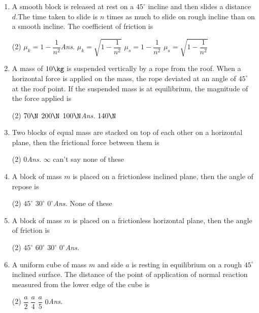 \documentclass{article}
\newcommand{\ans}{\textcolor{red!95}{\textit{\quad Ans.}}}
\begin{document}
\begin{enumerate}
\item A smooth block is released at rest on a $45^\circ$ incline and then slides a distance $d$.The time taken to slide is $n$ times as much to slide on rough incline than on a smooth incline. The coefficient of friction is
\begin{tasks}(2)
	\task $\mu_k=1-\dfrac{1}{n^2}$\ans
	\task $\mu_k=\sqrt{1-\dfrac{1}{n^2}}$
	\task $\mu_s=1-\dfrac{1}{n^2}$
	\task $\mu_s=\sqrt{1-\dfrac{1}{n^2}}$
\end{tasks}

\item A mass of $10 \kg$ is suspended vertically by a rope from the roof. When a horizontal force is applied on the mass, the rope deviated at an angle of $45^\circ$ at the roof point. If the suspended mass is at equilibrium, the magnitude of the force applied is
\begin{tasks}(2)
	\task $70\N$
	\task $200\N$
	\task $100\N$\ans
	\task $140\N$
\end{tasks}


\item Two blocks of equal mass are stacked on top of each other on a horizontal plane, then the frictional force between them is
\begin{tasks}(2)
	\task $0$\ans
	\task $\infty$
	\task can't say
	\task none of these
\end{tasks}

\item A block of mass $m$ is placed on a frictionless inclined plane, then the angle of repose is 
\begin{tasks}(2)
	\task $45^\circ$
	\task $30^\circ$
	\task $0^\circ$\ans
	\task None of these
\end{tasks}

\item A block of mass $m$ is placed on a frictionless horizontal plane, then the angle of friction is 
\begin{tasks}(2)
	\task $45^\circ$
	\task $60^\circ$
	\task $30^\circ$
	\task $0^\circ$\ans
\end{tasks}

\item A uniform cube of mass $m$ and side $a$ is resting in equilibrium on a rough $45^\circ$ inclined surface. The distance of the point of application of normal reaction measured from the lower edge of the cube is 
\begin{tasks}(2)
	\task $\dfrac{a}{2}$
	\task $\dfrac{a}{4}$
	\task $\dfrac{a}{5}$
	\task $0$\ans
\end{tasks}



\end{enumerate}
\end{document}
